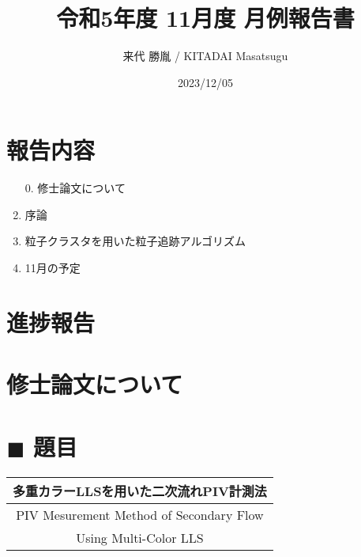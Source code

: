 \documentclass[twocolumn,a4j]{jsarticle}
\author{来代 勝胤 / KITADAI Masatsugu}
\title{令和5年度 11月度 月例報告書}
\date{2023/12/05}
\begin{document}
\columnseprule=0.1mm
\maketitle

\section*{報告内容}
\begin{enumerate}[1.]
  \item [0.] 修士論文について
  \item 序論
  \item 粒子クラスタを用いた粒子追跡アルゴリズム
  \item 11月の予定
\end{enumerate}

\section*{進捗報告}

\setcounter{section}{-1}
\section{修士論文について}

\begin{table}[hbtp]
  \section*{$\blacksquare$ 題目}
  \centering
  \begin{tabular}{c}
    \hline
    多重カラーLLSを用いた二次流れPIV計測法  \\ \hline
    PIV Mesurement Method of Secondary Flow \\
    Using Multi-Color LLS                   \\ \hline
  \end{tabular}
\end{table}
\end{document}
